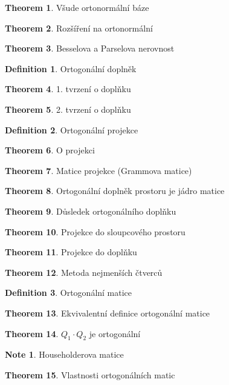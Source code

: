 \documentclass[a4paper]{article}
\theoremstyle{definition}
\newtheorem{definition}{Definition}
\newtheorem{theorem}{Theorem}
\newtheorem{note}{Note}
\begin{document}
\begin{theorem}{Všude ortonormální báze} \end{theorem}
\begin{theorem}{Rozšíření na ortonormální} \end{theorem}
\begin{theorem}{Besselova a Parselova nerovnost} \end{theorem}
\begin{definition}{Ortogonální doplněk} \end{definition}
\begin{theorem}{1. tvrzení o doplňku} \end{theorem}
\begin{theorem}{2. tvrzení o doplňku} \end{theorem}
\begin{definition}{Ortogonální projekce} \end{definition}
\begin{theorem}{O projekci} \end{theorem}
\begin{theorem}{Matice projekce (Grammova matice)} \end{theorem}
\begin{theorem}{Ortogonální doplněk prostoru je jádro matice} \end{theorem}
\begin{theorem}{Důsledek ortogonálního doplňku} \end{theorem}
\begin{theorem}{Projekce do sloupcového prostoru} \end{theorem}
\begin{theorem}{Projekce do doplňku} \end{theorem}
\begin{theorem}{Metoda nejmenších čtverců} \end{theorem}
\begin{definition}{Ortogonální matice} \end{definition}
\begin{theorem}{Ekvivalentní definice ortogonální matice} \end{theorem}
\begin{theorem}{$Q_1 \cdot Q_2$ je ortogonální} \end{theorem}
\begin{note}{Householderova matice} \end{note}
\begin{theorem}{Vlastnosti ortogonálních matic} \end{theorem}
\end{document}
